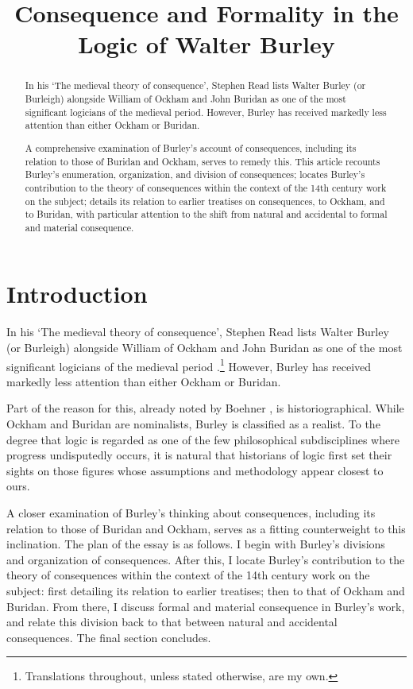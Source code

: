 \documentclass[]{birkjour}
\title{Consequence and Formality in the Logic of Walter Burley}
\author{}
\begin{document}
\begin{abstract}
In his `The medieval theory of consequence', Stephen Read lists Walter Burley (or Burleigh) alongside William of Ockham and John Buridan as one of the most significant logicians of the medieval period. However, Burley has received markedly less attention than either Ockham or Buridan. 

A comprehensive examination of Burley's account of consequences, including its relation to those of Buridan and Ockham, serves to remedy this. This article recounts Burley's enumeration, organization, and division of consequences; locates Burley's contribution to the theory of consequences within the context of the 14th century work on the subject; details its relation to earlier treatises on consequences, to Ockham, and to Buridan, with particular attention to the shift from natural and accidental to formal and material consequence.
\end{abstract}
\maketitle
\section{Introduction}
In his `The medieval theory of consequence', Stephen Read lists Walter Burley (or Burleigh) alongside William of Ockham and John Buridan as one of the most significant logicians of the medieval period .\footnote{\cite[p. 900]{Read2012} Translations throughout, unless stated otherwise, are my own.} However, Burley has received markedly less attention than either Ockham or Buridan. 

Part of the reason for this, already noted by Boehner \autocite[p. VI]{Boehner1955}, is historiographical. While Ockham and Buridan are nominalists, Burley is classified as a realist. To the degree that logic is regarded as one of the few philosophical subdisciplines where progress undisputedly occurs, it is natural that historians of logic first set their sights on those figures whose assumptions and methodology appear closest to ours. 

A closer examination of Burley's thinking about consequences, including its relation to those of Buridan and Ockham, serves as a fitting counterweight to this inclination. The plan of the essay is as follows. I begin with Burley's divisions and organization of consequences. After this, I locate Burley's contribution to the theory of consequences within the context of the 14th century work on the subject: first detailing its relation to earlier treatises; then to that of Ockham and Buridan. From there, I discuss formal and material consequence in Burley's work, and relate this division back to that between natural and accidental consequences. The final section concludes.
\end{document}
